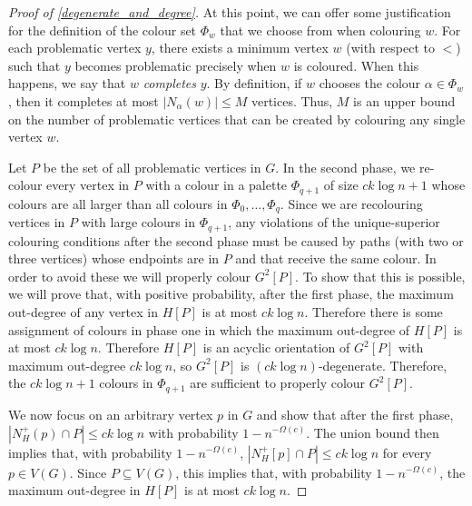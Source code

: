 \documentclass{patmorin}
\newcommand{\defin}[1]{\emph{\color{brightmaroon}#1}}
\begin{document}
\begin{proof}[Proof of \cref{degenerate_and_degree}]
  At this point, we can offer some justification for the definition of the colour set $\Phi_w$ that we choose from when colouring $w$. For each problematic vertex $y$, there exists a minimum vertex $w$ (with respect to $<$) such that $y$ becomes problematic precisely when $w$ is coloured.  When this happens, we say that $w$ \defin{completes} $y$. By definition, if $w$ chooses the colour $\alpha\in\Phi_w$, then it completes at most $|N_{\alpha}(w)|\le M$ vertices. Thus, $M$ is an upper bound on the number of problematic vertices that can be created by colouring any single vertex $w$.

  Let $P$ be the set of all problematic vertices in $G$.  In the second phase, we re-colour every vertex in $P$ with a colour in a palette $\Phi_{q+1}$ of size $ck\log n + 1$ whose colours are all larger than all colours in $\Phi_0,\ldots,\Phi_q$.  Since we are recolouring vertices in $P$ with large colours in $\Phi_{q+1}$, any violations of the unique-superior colouring conditions after the second phase must be caused by paths (with two or three vertices) whose endpoints are in $P$ and that receive the same colour.  In order to avoid these we will properly colour $G^2[P]$.  To show that this is possible, we will prove that, with positive probability, after the first phase, the maximum out-degree of any vertex in $H[P]$ is at most $ck\log n$.  Therefore there is some assignment of colours in phase one in which the maximum out-degree of $H[P]$ is at most $ck\log n$.  Therefore $H[P]$ is an acyclic orientation of $G^2[P]$ with maximum out-degree $ck\log n$, so $G^2[P]$ is $(ck\log n)$-degenerate.  Therefore, the $ck\log n + 1$ colours in $\Phi_{q+1}$ are sufficient to properly colour $G^2[P]$.

  We now focus on an arbitrary vertex $p$ in $G$ and show that after the first phase, $|N^+_{H}(p)\cap P|\le ck\log n$ with probability $1-n^{-\Omega(c)}$.  The union bound then implies that, with probability $1-n^{-\Omega(c)}$, $|N^+_{H}[p]\cap P|\le ck\log n$ for every $p\in V(G)$.  Since $P\subseteq V(G)$, this implies that, with probability $1-n^{-\Omega(c)}$, the maximum out-degree in $H[P]$ is at most $ck\log n$.


\end{proof}
\end{document}
